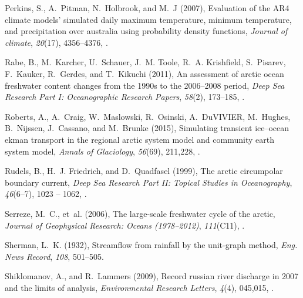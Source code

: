 \documentclass[jgrga, draft]{agutex}
\begin{document}
\begin{article}
\begin{thebibliography}{79}
Perkins, S., A.~Pitman, N.~Holbrook, and M.~J (2007), Evaluation of the {AR4}
  climate models' simulated daily maximum temperature, minimum temperature, and
  precipitation over australia using probability density functions,
  \textit{Journal of climate}, \textit{20}(17), 4356--4376,
  .

Rabe, B., M.~Karcher, U.~Schauer, J.~M. Toole, R.~A. Krishfield, S.~Pisarev,
  F.~Kauker, R.~Gerdes, and T.~Kikuchi (2011), An assessment of arctic ocean
  freshwater content changes from the 1990s to the 2006--2008 period,
  \textit{Deep Sea Research Part I: Oceanographic Research Papers},
  \textit{58}(2), 173--185, .

Roberts, A., A.~Craig, W.~Maslowski, R.~Osinski, A.~DuVIVIER, M.~Hughes,
  B.~Nijssen, J.~Cassano, and M.~Brunke (2015), Simulating transient
  ice–ocean ekman transport in the regional arctic system model and community
  earth system model, \textit{Annals of Glaciology}, \textit{56}(69), 211,228,
  .

Rudels, B., H.~J. Friedrich, and D.~Quadfasel (1999), The arctic circumpolar
  boundary current, \textit{Deep Sea Research Part II: Topical Studies in
  Oceanography}, \textit{46}(6–7), 1023 -- 1062,
  .

Serreze, M.~C., et~al. (2006), The large-scale freshwater cycle of the arctic,
  \textit{Journal of Geophysical Research: Oceans (1978--2012)},
  \textit{111}(C11), .

Sherman, L.~K. (1932), Streamflow from rainfall by the unit-graph method,
  \textit{Eng. News Record}, \textit{108}, 501--505.

Shiklomanov, A., and R.~Lammers (2009), Record russian river discharge in 2007
  and the limits of analysis, \textit{Environmental Research Letters},
  \textit{4}(4), 045,015, .


\end{thebibliography}
\end{article}
\end{document}
